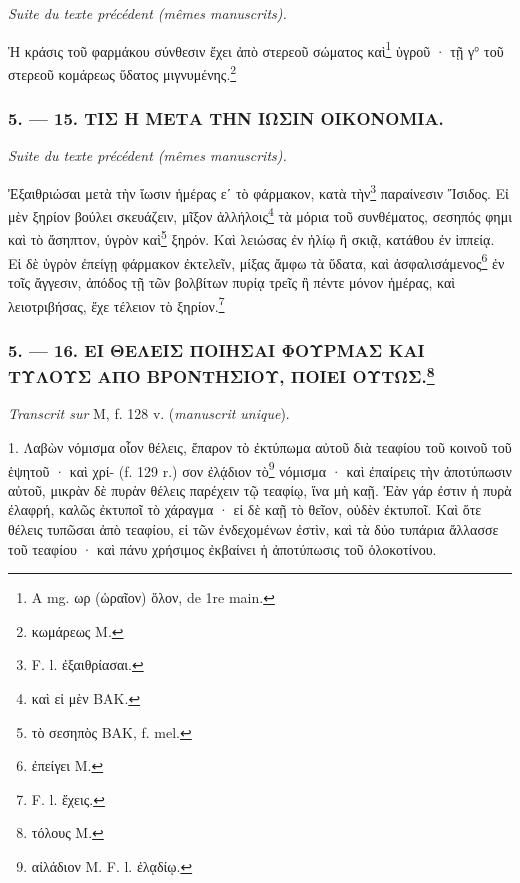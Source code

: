 \documentclass[a4paper, 11pt, oneside, polutonikogreek, french]{article}
\begin{document}
\emph{Suite du texte précédent (mêmes manuscrits).}

Ἡ κράσις τοῦ φαρμάκου σύνθεσιν ἔχει ἀπὸ στερεοῦ σώματος καὶ\footnote{A mg. ωρ (ὡραῖον) ὅλον, de 1re main.} ὑγροῦ · τῇ γ° τοῦ στερεοῦ κομάρεως ὕδατος μιγνυμένης.\footnote{κωμάρεως M.}

\bigskip
\centerline{\EightStarTaper}
\centerline{\EightStarTaper\EightStarTaper}
\bigskip

\subsubsection{5. --- 15. ΤΙΣ Η ΜΕΤΑ ΤΗΝ ΙΩΣΙΝ ΟΙΚΟΝΟΜΙΑ.}

\emph{Suite du texte précédent (mêmes manuscrits).}

Ἐξαιθριώσαι μετὰ τὴν ἴωσιν ἡμέρας εʹ τὸ φάρμακον, κατὰ τὴν\footnote{F. l. ἐξαιθρίασαι.} παραίνεσιν Ἴσιδος. Εἰ μὲν ξηρίον βούλει σκευάζειν, μῖξον ἀλλήλοις\footnote{καὶ εἰ μὲν BAK.} τὰ μόρια τοῦ συνθέματος, σεσηπός φημι καὶ τὸ ἄσηπτον, ὑγρὸν καὶ\footnote{τὸ σεσηπὸς BAK, f. mel.} ξηρόν. Καὶ λειώσας ἐν ἡλίῳ ἢ σκιᾷ, κατάθου ἐν ἱππείᾳ. Εἰ δὲ ὑγρὸν ἐπείγῃ φάρμακον ἐκτελεῖν, μίξας ἄμφω τὰ ὕδατα, καὶ ἀσφαλισάμενος\footnote{ἐπείγει M.} ἐν τοῖς ἄγγεσιν, ἀπόδος τῇ τῶν βολβίτων πυρίᾳ τρεῖς ἢ πέντε μόνον ἡμέρας, καὶ λειοτριβήσας, ἔχε τέλειον τὸ ξηρίον.\footnote{F. l. ἔχεις.}

\bigskip
\centerline{\EightStarTaper}
\centerline{\EightStarTaper\EightStarTaper}
\bigskip

\subsubsection[5. --- 16. ΕΙ ΘΕΛΕΙΣ ΠΟΙΗΣΑΙ ΦΟΥΡΜΑΣ ΚΑΙ ΤΥΛΟΥΣ ΑΠΟ ΒΡΟΝΤΗΣΙΟΥ, ΠΟΙΕΙ ΟΥΤΩΣ.]{5. --- 16. ΕΙ ΘΕΛΕΙΣ ΠΟΙΗΣΑΙ ΦΟΥΡΜΑΣ ΚΑΙ ΤΥΛΟΥΣ ΑΠΟ ΒΡΟΝΤΗΣΙΟΥ, ΠΟΙΕΙ ΟΥΤΩΣ.\footnote{τόλους M.}}

\emph{Transcrit sur} M, f. 128 v. (\emph{manuscrit unique}).

1. Λαβὼν νόμισμα οἷον θέλεις, ἔπαρον τὸ ἐκτύπωμα αὐτοῦ διὰ τεαφίου τοῦ κοινοῦ τοῦ ἑψητοῦ · καὶ χρί- (f. 129 r.) σον ἐλᾴδιον τὸ\footnote{αἰλάδιον M. F. l. ἐλᾳδίῳ.} νόμισμα · καὶ ἐπαίρεις τὴν ἀποτύπωσιν αὐτοῦ, μικρὰν δὲ πυρὰν θέλεις παρέχειν τῷ τεαφίῳ, ἵνα μὴ καῇ. Ἐὰν γάρ ἐστιν ἡ πυρὰ ἐλαφρή, καλῶς ἐκτυποῖ τὸ χάραγμα · εἰ δὲ καῇ τὸ θεῖον, οὐδὲν ἐκτυποῖ. Καὶ ὅτε θέλεις τυπῶσαι ἀπὸ τεαφίου, εἰ τῶν ἐνδεχομένων ἐστὶν, καὶ τὰ δύο τυπάρια ἄλλασσε τοῦ τεαφίου · καὶ πάνυ χρήσιμος ἐκβαίνει ἡ ἀποτύπωσις τοῦ ὁλοκοτίνου.
\end{document}
